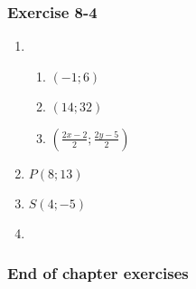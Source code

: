 \subsubsection*{Exercise 8-4} %
\begin{enumerate}[noitemsep, label=\textbf{\arabic*}. ]
\item %
  \begin{enumerate}[noitemsep, label=\textbf{(\alph*)} ]
\item $(-1 ; 6)$%
\item $(14 ; 32)$%
\item $(\frac{2x - 2}{2} ; \frac{2y - 5}{2})$%
\end{enumerate}

\item $P(8 ; 13)$%
\item $S(4 ; -5)$%

\item %
\end{enumerate}
\subsubsection*{End of chapter exercises} %

